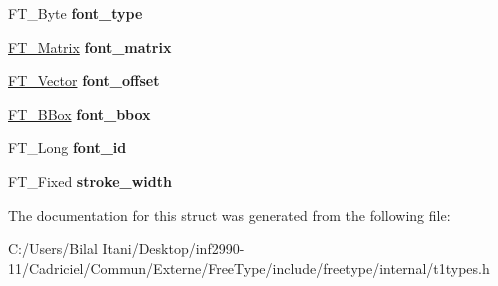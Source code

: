 \begin{DoxyCompactItemize}
\item 
F\+T\+\_\+\+Byte {\bfseries font\+\_\+type}\hypertarget{struct_t1___font_rec___a9d37e54d3a584f823dca80eca624f700}{}\label{struct_t1___font_rec___a9d37e54d3a584f823dca80eca624f700}

\item 
\hyperlink{struct_f_t___matrix__}{F\+T\+\_\+\+Matrix} {\bfseries font\+\_\+matrix}\hypertarget{struct_t1___font_rec___a87c95f084851d2bb9e48889e9444b2a8}{}\label{struct_t1___font_rec___a87c95f084851d2bb9e48889e9444b2a8}

\item 
\hyperlink{struct_f_t___vector__}{F\+T\+\_\+\+Vector} {\bfseries font\+\_\+offset}\hypertarget{struct_t1___font_rec___ab6e773e20df1c585dc14ee3fa7ed1737}{}\label{struct_t1___font_rec___ab6e773e20df1c585dc14ee3fa7ed1737}

\item 
\hyperlink{struct_f_t___b_box__}{F\+T\+\_\+\+B\+Box} {\bfseries font\+\_\+bbox}\hypertarget{struct_t1___font_rec___a86fd1af4c03e34b7d151054ccc7525a7}{}\label{struct_t1___font_rec___a86fd1af4c03e34b7d151054ccc7525a7}

\item 
F\+T\+\_\+\+Long {\bfseries font\+\_\+id}\hypertarget{struct_t1___font_rec___a14178cf438d1a5fcb31b7d398d06cfaf}{}\label{struct_t1___font_rec___a14178cf438d1a5fcb31b7d398d06cfaf}

\item 
F\+T\+\_\+\+Fixed {\bfseries stroke\+\_\+width}\hypertarget{struct_t1___font_rec___ac71ace1872be6b2adbd3d6f5ca456d23}{}\label{struct_t1___font_rec___ac71ace1872be6b2adbd3d6f5ca456d23}

\end{DoxyCompactItemize}


The documentation for this struct was generated from the following file\+:\begin{DoxyCompactItemize}
\item 
C\+:/\+Users/\+Bilal Itani/\+Desktop/inf2990-\/11/\+Cadriciel/\+Commun/\+Externe/\+Free\+Type/include/freetype/internal/t1types.\+h\end{DoxyCompactItemize}
